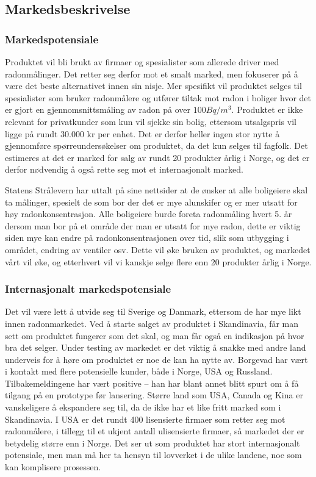 \subsection{Markedsbeskrivelse}

\subsubsection{Markedspotensiale}

Produktet vil bli brukt av firmaer og spesialister som allerede driver med radonmålinger. Det retter seg derfor mot et smalt marked, men fokuserer på å være det beste alternativet innen sin nisje. Mer spesifikt vil produktet selges til spesialister som bruker radonmålere og utfører tiltak mot radon i boliger hvor det er gjort en gjennomsnittsmåling av radon på over $100 Bq/m^3$. Produktet er ikke relevant for privatkunder som kun vil sjekke sin bolig, ettersom utsalgspris vil ligge på rundt 30.000 kr per enhet. Det er derfor heller ingen stor nytte å gjennomføre spørreundersøkelser om produktet, da det kun selges til fagfolk. Det estimeres at det er marked for salg av rundt 20 produkter årlig i Norge, og det er derfor nødvendig å også rette seg mot et internasjonalt marked.

Statens Strålevern har uttalt på sine nettsider at de ønsker at alle boligeiere skal ta målinger, spesielt de som bor der det er mye alunskifer og er mer utsatt for høy radonkonsentrasjon.
Alle boligeiere burde foreta radonmåling hvert 5. år dersom man bor på et område der man er utsatt for mye radon, dette er viktig siden mye kan endre på radonkonsentrasjonen over tid, slik som utbygging i området, endring av ventiler osv.
Dette vil øke bruken av produktet, og markedet vårt vil øke, og etterhvert vil vi kanskje selge flere enn 20 produkter årlig i Norge.

\subsubsection{Internasjonalt markedspotensiale}

Det vil være lett å utvide seg til Sverige og Danmark, ettersom de har mye likt innen radonmarkedet. Ved å starte salget av produktet i Skandinavia, får man sett om produktet fungerer som det skal, og man får også en indikasjon på hvor bra det selger. Under testing av markedet er det viktig å snakke med andre land underveis for å høre om produktet er noe de kan ha nytte av.
Borgevad har vært i kontakt med flere potensielle kunder, både i Norge, USA og Russland.
Tilbakemeldingene har vært positive – han har blant annet blitt spurt om å få tilgang på en prototype før lansering.
Større land som USA, Canada og Kina er vanskeligere å ekspandere seg til, da de ikke har et like fritt marked som i Skandinavia.
I USA er det rundt 400 lisensierte firmaer som retter seg mot radonmålere, i tillegg til et ukjent antall ulisensierte firmaer, så markedet der er betydelig større enn i Norge.
Det ser ut som produktet har stort internasjonalt potensiale, men man må her ta hensyn til lovverket i de ulike landene, noe som kan komplisere prosessen.

